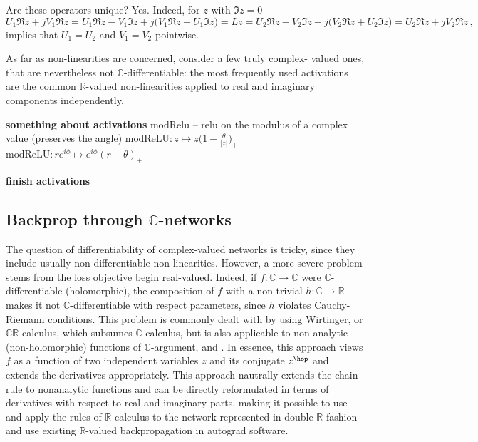 \documentclass[a4paper,10pt]{article}
\newcommand{\important}[1]{\textbf{\color{red} #1}}
\newcommand{\todo}{\important}  %
\newcommand{\real}{\mathbb{R}}
\newcommand{\cplx}{\mathbb{C}}
\begin{document}
Are these operators unique? Yes. Indeed, for $z$ with $\Im z = 0$ 
$$
U_1 \Re z + j V_1 \Re z
  = U_1 \Re z - V_1 \Im z + j \bigl( V_1 \Re z + U_1 \Im z \bigr)
  = L z
  = U_2 \Re z - V_2 \Im z + j \bigl( V_2 \Re z + U_2 \Im z \bigr)
  = U_2 \Re z + j V_2 \Re z
  \,, $$
implies that $U_1 = U_2$ and $V_1 = V_2$ pointwise.

As far as non-linearities are concerned, \cite{trabelsi_deep_2017} consider a few truly complex-%
valued ones, that are nevertheless not $\cplx$-differentiable: the most frequently used activations are the common $\real$-valued non-linearities applied to real and
imaginary components independently.

\todo{something about activations}
modRelu -- relu on the modulus of a complex value (preserves the angle)
$
\mathrm{modReLU}
  \colon z \mapsto z \bigl(
    1 - \tfrac\theta{\lvert z \rvert}
  \bigr)_+
$
$
\mathrm{modReLU}
  \colon r e^{i \phi} \mapsto e^{i \phi} (r - \theta)_+
$

\todo{finish activations}

\subsection{Backprop through $\cplx$-networks} %
\label{sub:backprop_through_c_networks}

The question of differentiability of complex-valued networks is tricky, since they include
usually non-differentiable non-linearities. However, a more severe problem stems from the loss
objective begin real-valued. Indeed, if $f\colon \cplx \to \cplx$ were $\cplx$-differentiable
(holomorphic), the composition of $f$ with a non-trivial $h \colon \cplx\to \real$ makes it
not $\cplx$-differentiable with respect parameters, since $h$ violates Cauchy-Riemann conditions.
This problem is commonly dealt with by using Wirtinger, or $\cplx\real$ calculus, which subsumes
$\cplx$-calculus, but is also applicable to non-analytic (non-holomorphic) functions of
$\cplx$-argument, \cite{adali_complex-valued_2011} and \cite{trabelsi_deep_2017}. In essence,
this approach views $f$ as a function of two independent variables $z$ and its conjugate $z^\hop$
and extends the derivatives appropriately. This approach nautrally extends the chain rule to
nonanalytic functions and can be directly reformulated in terms of derivatives with respect
to real and imaginary parts, making it possible to use and apply the rules of $\real$-calculus
to the network represented in double-$\real$ fashion and use existing $\real$-valued
backpropagation in autograd software.
\end{document}
